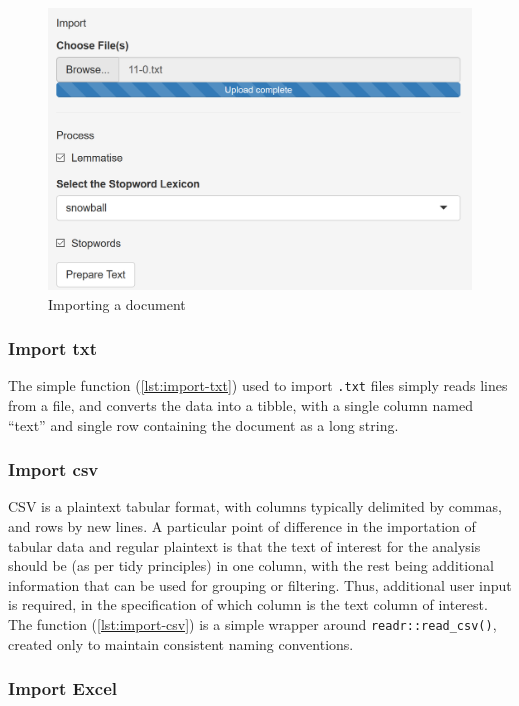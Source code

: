 \documentclass[11pt, a4paper, twoside, titlepage]{report}
\begin{document}
\begin{figure}
\centering
\includegraphics[scale=0.7]{processing-import-process.png}
\caption{Importing a document\label{fig:processing-import-pro}}
\end{figure}

\subsubsection{Import txt}

The simple function (\cref{lst:import-txt}) used to import
\texttt{.txt} files simply reads lines from a file, and converts the
data into a tibble\autocite{muller19tib}, with a single column named ``text'' and single row
containing the document as a long string.

\subsubsection{Import csv}

CSV is a plaintext tabular format, with columns typically delimited by
commas, and rows by new lines. A particular point of difference in the
importation of tabular data and regular plaintext is that the text of
interest for the analysis should be (as per tidy principles) in one
column, with the rest being additional information that can be used
for grouping or filtering. Thus, additional user input is required, in
the specification of which column is the text column of interest. The
function (\cref{lst:import-csv}) is a simple wrapper around
\texttt{readr::read_csv()}\autocite{wickham18red}, created only
to maintain consistent naming conventions.

\subsubsection{Import Excel}
\end{document}
